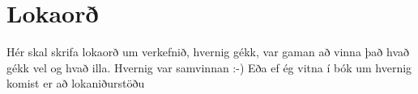 \section{Lokaorð}
Hér skal skrifa lokaorð um verkefnið, hvernig gékk, var gaman að vinna það hvað gékk vel og hvað illa. Hvernig var samvinnan :-) \cite{brock} Eða ef ég vitna í bók um hvernig komist er að lokaniðurstöðu \cite{runeson2009guidelines}
